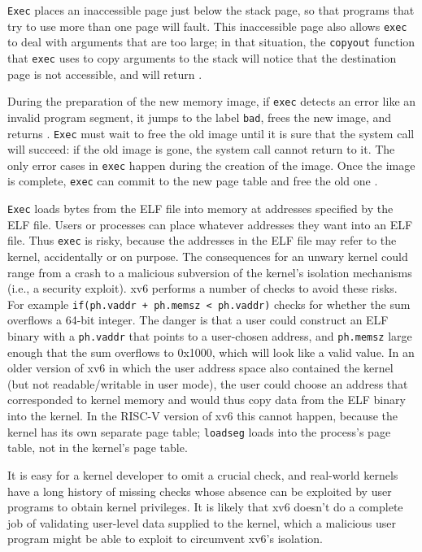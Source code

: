 \lstinline{Exec}
places an inaccessible page just below the stack page,
so that programs that try to use more than one page will fault.
This inaccessible page also allows
\lstinline{exec}
to deal with arguments that are too large;
in that situation,
the
\lstinline{copyout}
function that
\lstinline{exec}
uses to copy arguments to the stack will notice that
the destination page is not accessible, and will
return .

During the preparation of the new memory image,
if
\lstinline{exec}
detects an error like an invalid program segment,
it jumps to the label
\lstinline{bad},
frees the new image,
and returns .
\lstinline{Exec}
must wait to free the old image until it
is sure that the system call will succeed:
if the old image is gone,
the system call cannot return  to it.
The only error cases in
\lstinline{exec}
happen during the creation of the image.
Once the image is complete,
\lstinline{exec}
can commit to the new page table
and free the old one
.

\lstinline{Exec}
loads bytes from the ELF file into memory at addresses specified by the ELF file.
Users or processes can place whatever addresses they want into an ELF file.
Thus
\lstinline{exec}
is risky, because the addresses in the ELF file may refer to the kernel, accidentally
or on purpose. The consequences for an unwary kernel could range from
a crash to a malicious subversion of the kernel's isolation mechanisms
(i.e., a security exploit).
xv6 performs a number of checks to avoid these risks.
For example
\lstinline{if(ph.vaddr + ph.memsz < ph.vaddr)}
checks for whether the sum overflows a 64-bit integer.
The danger is that a user could construct an ELF binary with a
\lstinline{ph.vaddr}
that points to a user-chosen address,
and
\lstinline{ph.memsz}
large enough that the sum overflows to 0x1000, which will look like a
valid value. In an older version of xv6 in which the user address
space also contained the kernel (but not readable/writable in user
mode), the user could choose an address that corresponded to kernel
memory and would thus copy data from the ELF binary into the kernel.
In the RISC-V version of xv6 this cannot happen, because the kernel has
its own separate page table;
\lstinline{loadseg}
loads into the process's page table, not in the kernel's page table.

It is easy for a kernel developer to omit a crucial check, and
real-world kernels have a long history of missing checks whose absence
can be exploited by user programs to obtain kernel privileges.  It is likely that xv6 doesn't do a complete job of validating
user-level data supplied to the kernel, which a malicious user program might be able to exploit to circumvent xv6's isolation.
